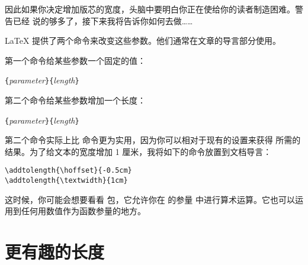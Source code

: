 因此如果你决定增加版芯的宽度，头脑中要明白你正在使给你的读者制造困难。警告已经
说的够多了，接下来我将告诉你如何去做……

\LaTeX{} 提供了两个命令来改变这些参数。他们通常在文章的导言部分使用。

第一个命令给某些参数一个固定的值：
\begin{lscommand}
\verb|{|\emph{parameter}\verb|}{|\emph{length}\verb|}|
\end{lscommand}


第二个命令给某些参数增加一个长度：
\begin{lscommand}
\verb|{|\emph{parameter}\verb|}{|\emph{length}\verb|}|
\end{lscommand}

第二个命令实际上比  命令更为实用，因为你可以相对于现有的设置来获得
所需的结果。为了给文本的宽度增加 1 厘米，我将如下的命令放置到文档导言：
\begin{code}
\verb|\addtolength{\hoffset}{-0.5cm}|\\
\verb|\addtolength{\textwidth}{1cm}|
\end{code}

这时候，你可能会想要看看  包，它允许你在  的参量
中进行算术运算。它也可以运用到任何用数值作为函数参量的地方。


\section{更有趣的长度}

